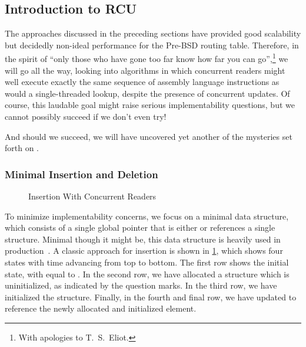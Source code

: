 
\subsection{Introduction to RCU}
\label{sec:defer:Introduction to RCU}

The approaches discussed in the preceding sections have provided
good scalability but decidedly non-ideal performance for the
Pre-BSD routing table.
Therefore, in the spirit of ``only those who have gone too far
know how far you can go'',\footnote{
	With apologies to T.~S.~Eliot.}
we will go all the way, looking into algorithms in which concurrent
readers might well execute exactly the same sequence of assembly language
instructions as would a single-threaded lookup, despite the presence of
concurrent updates.
Of course, this laudable goal might raise serious implementability
questions, but we cannot possibly succeed if we don't even try!

And should we succeed, we will have uncovered yet another of the
mysteries set forth on
.

\subsubsection{Minimal Insertion and Deletion}
\label{sec:defer:Minimal Insertion and Deletion}

\begin{figure}
\centering
{}
\caption{Insertion With Concurrent Readers}
\label{fig:defer:Insertion With Concurrent Readers}
\end{figure}

To minimize implementability concerns, we focus on a minimal
data structure, which consists of a single global pointer that is either
 or references a single structure.
Minimal though it might be, this data structure is heavily used in
production~\cite{GeoffRomer2018C++DeferredReclamationP0561R4}.
A classic approach for insertion is shown in
\cref{fig:defer:Insertion With Concurrent Readers},
which shows four states with time advancing from top to bottom.
The first row shows the initial state, with  equal to .
In the second row, we have allocated a structure which is uninitialized,
as indicated by the question marks.
In the third row, we have initialized the structure.
Finally, in the fourth and final row, we have updated  to
reference the newly allocated and initialized element.

